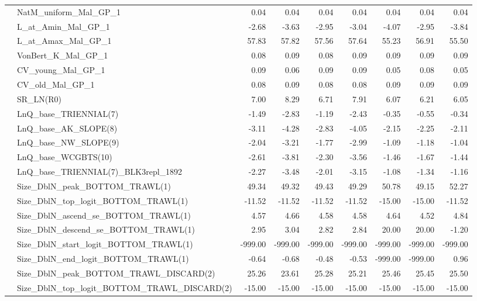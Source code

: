 \documentclass[
]{scrartcl}
\begin{document}
\begin{landscape}
\begin{longtable}{llrrrrrrr}
 & NatM\_uniform\_Mal\_GP\_1 & 0.04 & 0.04 & 0.04 & 0.04 & 0.04 & 0.04 & 0.04 \\ 
 & L\_at\_Amin\_Mal\_GP\_1 & -2.68 & -3.63 & -2.95 & -3.04 & -4.07 & -2.95 & -3.84 \\ 
 & L\_at\_Amax\_Mal\_GP\_1 & 57.83 & 57.82 & 57.56 & 57.64 & 55.23 & 56.91 & 55.50 \\ 
 & VonBert\_K\_Mal\_GP\_1 & 0.08 & 0.09 & 0.08 & 0.09 & 0.09 & 0.09 & 0.09 \\ 
 & CV\_young\_Mal\_GP\_1 & 0.09 & 0.06 & 0.09 & 0.09 & 0.05 & 0.08 & 0.05 \\ 
 & CV\_old\_Mal\_GP\_1 & 0.08 & 0.09 & 0.08 & 0.08 & 0.09 & 0.09 & 0.09 \\ 
 & SR\_LN(R0) & 7.00 & 8.29 & 6.71 & 7.91 & 6.07 & 6.21 & 6.05 \\ 
 & LnQ\_base\_TRIENNIAL(7) & -1.49 & -2.83 & -1.19 & -2.43 & -0.35 & -0.55 & -0.34 \\ 
 & LnQ\_base\_AK\_SLOPE(8) & -3.11 & -4.28 & -2.83 & -4.05 & -2.15 & -2.25 & -2.11 \\ 
 & LnQ\_base\_NW\_SLOPE(9) & -2.04 & -3.21 & -1.77 & -2.99 & -1.09 & -1.18 & -1.04 \\ 
 & LnQ\_base\_WCGBTS(10) & -2.61 & -3.81 & -2.30 & -3.56 & -1.46 & -1.67 & -1.44 \\ 
 & LnQ\_base\_TRIENNIAL(7)\_BLK3repl\_1892 & -2.27 & -3.48 & -2.01 & -3.15 & -1.08 & -1.34 & -1.16 \\ 
 & Size\_DblN\_peak\_BOTTOM\_TRAWL(1) & 49.34 & 49.32 & 49.43 & 49.29 & 50.78 & 49.15 & 52.27 \\ 
 & Size\_DblN\_top\_logit\_BOTTOM\_TRAWL(1) & -11.52 & -11.52 & -11.52 & -11.52 & -15.00 & -15.00 & -11.52 \\ 
 & Size\_DblN\_ascend\_se\_BOTTOM\_TRAWL(1) & 4.57 & 4.66 & 4.58 & 4.58 & 4.64 & 4.52 & 4.84 \\ 
 & Size\_DblN\_descend\_se\_BOTTOM\_TRAWL(1) & 2.95 & 3.04 & 2.82 & 2.84 & 20.00 & 20.00 & -1.20 \\ 
 & Size\_DblN\_start\_logit\_BOTTOM\_TRAWL(1) & -999.00 & -999.00 & -999.00 & -999.00 & -999.00 & -999.00 & -999.00 \\ 
 & Size\_DblN\_end\_logit\_BOTTOM\_TRAWL(1) & -0.64 & -0.68 & -0.48 & -0.53 & -999.00 & -999.00 & 0.96 \\ 
 & Size\_DblN\_peak\_BOTTOM\_TRAWL\_DISCARD(2) & 25.26 & 23.61 & 25.28 & 25.21 & 25.46 & 25.45 & 25.50 \\ 
 & Size\_DblN\_top\_logit\_BOTTOM\_TRAWL\_DISCARD(2) & -15.00 & -15.00 & -15.00 & -15.00 & -15.00 & -15.00 & -15.00 \\ 

\end{longtable}
\end{landscape}
\end{document}
